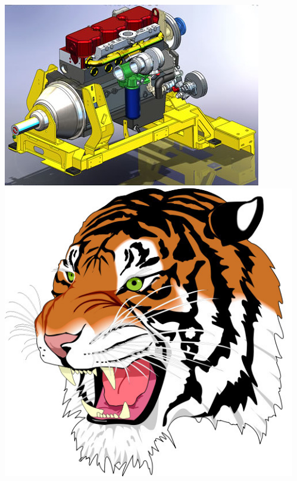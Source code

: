 \begin{frame}
\begin{columns}
\begin{column}{.2\textwidth}
\begin{center}
        \includegraphics[width=1.\textwidth]{images/solidworks.jpg} \\[5mm]
        \includegraphics[width=.8\textwidth]{images/tiger.jpg}
      \end{center}
    \end{column}
    \begin{column}[t]{.1\textwidth}
      \begin{center}

\end{center}
\end{column}
\end{columns}
\end{frame}
